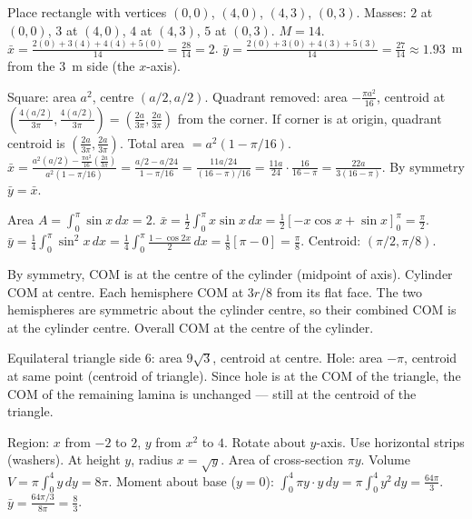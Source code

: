 \documentclass[11pt]{article}
\begin{document}
\begin{corrige}[Exercise 1]
Place rectangle with vertices $(0,0)$, $(4,0)$, $(4,3)$, $(0,3)$. Masses: $2$ at $(0,0)$, $3$ at $(4,0)$, $4$ at $(4,3)$, $5$ at $(0,3)$.
$M=14$. $\bar{x}=\frac{2(0)+3(4)+4(4)+5(0)}{14}=\frac{28}{14}=2$. $\bar{y}=\frac{2(0)+3(0)+4(3)+5(3)}{14}=\frac{27}{14}\approx 1.93$~m from the $3$~m side (the $x$-axis).
\end{corrige}

\begin{corrige}[Exercise 2]
Square: area $a^2$, centre $(a/2,a/2)$. Quadrant removed: area $-\frac{\pi a^2}{16}$, centroid at $(\frac{4(a/2)}{3\pi},\frac{4(a/2)}{3\pi})=(\frac{2a}{3\pi},\frac{2a}{3\pi})$ from the corner. If corner is at origin, quadrant centroid is $(\frac{2a}{3\pi},\frac{2a}{3\pi})$.
Total area $=a^2(1-\pi/16)$.
$\bar{x}=\frac{a^2(a/2) - \frac{\pi a^2}{16}(\frac{2a}{3\pi})}{a^2(1-\pi/16)} = \frac{a/2 - a/24}{1-\pi/16} = \frac{11a/24}{(16-\pi)/16} = \frac{11a}{24}\cdot\frac{16}{16-\pi} = \frac{22a}{3(16-\pi)}$.
By symmetry $\bar{y}=\bar{x}$.
\end{corrige}

\begin{corrige}[Exercise 3]
Area $A=\int_0^\pi \sin x\,dx = 2$.
$\bar{x}=\frac{1}{2}\int_0^\pi x\sin x\,dx = \frac{1}{2}[-x\cos x+\sin x]_0^\pi = \frac{\pi}{2}$.
$\bar{y}=\frac{1}{4}\int_0^\pi \sin^2 x\,dx = \frac{1}{4}\int_0^\pi \frac{1-\cos 2x}{2}\,dx = \frac{1}{8}[\pi-0] = \frac{\pi}{8}$.
Centroid: $(\pi/2, \pi/8)$.
\end{corrige}

\begin{corrige}[Exercise 4]
By symmetry, COM is at the centre of the cylinder (midpoint of axis). Cylinder COM at centre. Each hemisphere COM at $3r/8$ from its flat face. The two hemispheres are symmetric about the cylinder centre, so their combined COM is at the cylinder centre. Overall COM at the centre of the cylinder.
\end{corrige}

\begin{corrige}[Exercise 5]
Equilateral triangle side $6$: area $9\sqrt{3}$, centroid at centre. Hole: area $-\pi$, centroid at same point (centroid of triangle). Since hole is at the COM of the triangle, the COM of the remaining lamina is unchanged — still at the centroid of the triangle.
\end{corrige}

\begin{corrige}[Exercise 6]
Region: $x$ from $-2$ to $2$, $y$ from $x^2$ to $4$. Rotate about $y$-axis.
Use horizontal strips (washers). At height $y$, radius $x=\sqrt{y}$. Area of cross-section $\pi y$.
Volume $V=\pi\int_0^4 y\,dy = 8\pi$.
Moment about base ($y=0$): $\int_0^4 \pi y \cdot y\,dy = \pi\int_0^4 y^2\,dy = \frac{64\pi}{3}$.
$\bar{y} = \frac{64\pi/3}{8\pi} = \frac{8}{3}$.
\end{corrige}
\end{document}
